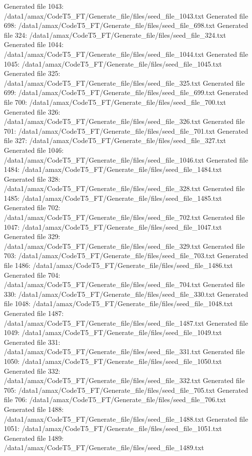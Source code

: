 Generated file 1043: /data1/amax/CodeT5_FT/Generate_file/files/seed_file_1043.txt
Generated file 698: /data1/amax/CodeT5_FT/Generate_file/files/seed_file_698.txt
Generated file 324: /data1/amax/CodeT5_FT/Generate_file/files/seed_file_324.txt
Generated file 1044: /data1/amax/CodeT5_FT/Generate_file/files/seed_file_1044.txt
Generated file 1045: /data1/amax/CodeT5_FT/Generate_file/files/seed_file_1045.txt
Generated file 325: /data1/amax/CodeT5_FT/Generate_file/files/seed_file_325.txt
Generated file 699: /data1/amax/CodeT5_FT/Generate_file/files/seed_file_699.txt
Generated file 700: /data1/amax/CodeT5_FT/Generate_file/files/seed_file_700.txt
Generated file 326: /data1/amax/CodeT5_FT/Generate_file/files/seed_file_326.txt
Generated file 701: /data1/amax/CodeT5_FT/Generate_file/files/seed_file_701.txt
Generated file 327: /data1/amax/CodeT5_FT/Generate_file/files/seed_file_327.txt
Generated file 1046: /data1/amax/CodeT5_FT/Generate_file/files/seed_file_1046.txt
Generated file 1484: /data1/amax/CodeT5_FT/Generate_file/files/seed_file_1484.txt
Generated file 328: /data1/amax/CodeT5_FT/Generate_file/files/seed_file_328.txt
Generated file 1485: /data1/amax/CodeT5_FT/Generate_file/files/seed_file_1485.txt
Generated file 702: /data1/amax/CodeT5_FT/Generate_file/files/seed_file_702.txt
Generated file 1047: /data1/amax/CodeT5_FT/Generate_file/files/seed_file_1047.txt
Generated file 329: /data1/amax/CodeT5_FT/Generate_file/files/seed_file_329.txt
Generated file 703: /data1/amax/CodeT5_FT/Generate_file/files/seed_file_703.txt
Generated file 1486: /data1/amax/CodeT5_FT/Generate_file/files/seed_file_1486.txt
Generated file 704: /data1/amax/CodeT5_FT/Generate_file/files/seed_file_704.txt
Generated file 330: /data1/amax/CodeT5_FT/Generate_file/files/seed_file_330.txt
Generated file 1048: /data1/amax/CodeT5_FT/Generate_file/files/seed_file_1048.txt
Generated file 1487: /data1/amax/CodeT5_FT/Generate_file/files/seed_file_1487.txt
Generated file 1049: /data1/amax/CodeT5_FT/Generate_file/files/seed_file_1049.txt
Generated file 331: /data1/amax/CodeT5_FT/Generate_file/files/seed_file_331.txt
Generated file 1050: /data1/amax/CodeT5_FT/Generate_file/files/seed_file_1050.txt
Generated file 332: /data1/amax/CodeT5_FT/Generate_file/files/seed_file_332.txt
Generated file 705: /data1/amax/CodeT5_FT/Generate_file/files/seed_file_705.txt
Generated file 706: /data1/amax/CodeT5_FT/Generate_file/files/seed_file_706.txt
Generated file 1488: /data1/amax/CodeT5_FT/Generate_file/files/seed_file_1488.txt
Generated file 1051: /data1/amax/CodeT5_FT/Generate_file/files/seed_file_1051.txt
Generated file 1489: /data1/amax/CodeT5_FT/Generate_file/files/seed_file_1489.txt
